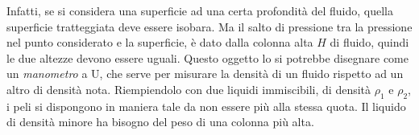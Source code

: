 \documentclass[10pt,a4paper]{book}
\begin{document}
\begin{figure}[htpb]
\end{figure}
\FloatBarrier
Infatti, se si considera una superficie ad una certa profondità del fluido, quella superficie tratteggiata deve essere isobara. Ma il salto di pressione tra la pressione nel punto considerato e la superficie, è dato dalla colonna alta $H$ di fluido, quindi le due altezze devono essere uguali. Questo oggetto lo si potrebbe disegnare come un \emph{manometro} a U, che serve per misurare la densità di un fluido rispetto ad un altro di densità nota. Riempiendolo con due liquidi immiscibili, di densità $\rho_1$ e $\rho_2$, i peli si dispongono in maniera tale da non essere più alla stessa quota. Il liquido di densità minore ha bisogno del peso di una colonna più alta.
\end{document}
